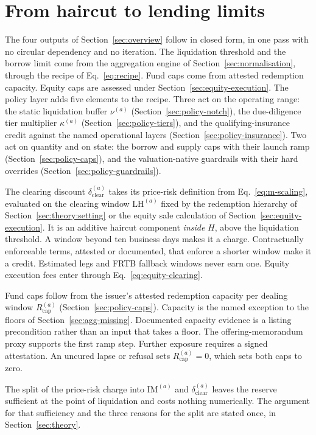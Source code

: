 \section{From haircut to lending limits}\label{sec:policy}
The four outputs of Section~\ref{sec:overview} follow in closed form, in one pass with no circular dependency and no iteration. The liquidation threshold and the borrow limit come from the aggregation engine of Section~\ref{sec:normalisation}, through the recipe of Eq.~\eqref{eq:recipe}. Fund caps come from attested redemption capacity. Equity caps are assessed under Section~\ref{sec:equity-execution}. The policy layer adds five elements to the recipe. Three act on the operating range: the static liquidation buffer $\nu^{(a)}$ (Section~\ref{sec:policy-notch}), the due-diligence tier multiplier $\kappa^{(a)}$ (Section~\ref{sec:policy-tiers}), and the qualifying-insurance credit against the named operational layers (Section~\ref{sec:policy-insurance}). Two act on quantity and on state: the borrow and supply caps with their launch ramp (Section~\ref{sec:policy-caps}), and the valuation-native guardrails with their hard overrides (Section~\ref{sec:policy-guardrails}).

The clearing discount $\delta_{\mathrm{clear}}^{(a)}$ takes its price-risk definition from Eq.~\eqref{eq:m-scaling}, evaluated on the clearing window $\mathrm{LH}^{(a)}$ fixed by the redemption hierarchy of Section~\ref{sec:theory:setting} or the equity sale calculation of Section~\ref{sec:equity-execution}. It is an additive haircut component \emph{inside} $H$, above the liquidation threshold. A window beyond ten business days makes it a charge. Contractually enforceable terms, attested or documented, that enforce a shorter window make it a credit. Estimated legs and FRTB fallback windows never earn one. Equity execution fees enter through Eq.~\eqref{eq:equity-clearing}.

Fund caps follow from the issuer's attested redemption capacity per dealing window $R_{\mathrm{cap}}^{(a)}$ (Section~\ref{sec:policy-caps}). Capacity is the named exception to the floors of Section~\ref{sec:agg-missing}. Documented capacity evidence is a listing precondition rather than an input that takes a floor. The offering-memorandum proxy supports the first ramp step. Further exposure requires a signed attestation. An uncured lapse or refusal sets $R_{\mathrm{cap}}^{(a)}=0$, which sets both caps to zero.

The split of the price-risk charge into $\mathrm{IM}^{(a)}$ and $\delta_{\mathrm{clear}}^{(a)}$ leaves the reserve sufficient at the point of liquidation and costs nothing numerically. The argument for that sufficiency and the three reasons for the split are stated once, in Section~\ref{sec:theory}.

